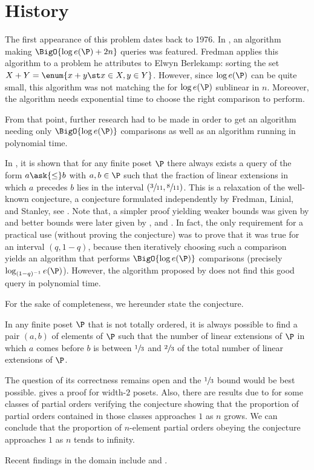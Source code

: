 \section{History}

The first appearance of this problem dates back to 1976. In
\citet*{fredman:1976}, an algorithm making $\BigO{\log e(\P) + 2n}$ queries was
featured. Fredman applies this algorithm to a problem he attributes to Elwyn
Berlekamp: sorting the set $X + Y = \enum{x + y \st x \in X, y \in Y}$.
However,
since \(\log e(\P)\) can be quite small, this algorithm was not matching the \ITLB
for $\log e(\P)$ sublinear in \(n\). Moreover, the algorithm needs exponential time to
choose the right comparison to perform.

From that point, further research had to be made in order to get an algorithm
needing only $\BigO{\log e(\P)}$ comparisons as well as an algorithm running in
polynomial time.

In \citet*{kahn1984balancing}, it is shown that for any finite poset \(\P\)
there always exists a query of the form \(a \ask{\leq} b\) with \(a,b \in \P\)
such that the fraction of linear extensions in which $a$ precedes $b$
lies in the interval $(\sfrac{3}{11}, \sfrac{8}{11})$. This is a relaxation of
the well-known \onethirdtwothird conjecture, a conjecture formulated
independently by Fredman, Linial, and Stanley, see
\citet*{linial:1984}. Note that, a simpler proof yielding weaker
bounds was given by \citet*{kahn1991balancing} and better bounds were later
given by \citet*{brightwell1995balancing}, and \citet*{brightwell1999balanced}.
In fact, the only requirement for a practical use (without proving the
conjecture) was to prove that it was true for an interval $(q, 1-q)$, because
then iteratively choosing such a comparison yields an algorithm that performs
$\BigO{\log e(\P)}$ comparisons (precisely $\log_{(1-q)^{-1}} e(\P)$). However, the
algorithm proposed by \citet*{kahn1984balancing} does not find this
good query in polynomial time.

For the sake of completeness, we hereunder state the \onethirdtwothird
conjecture.
\begin{conjecture}
In any finite poset $\P$ that is not totally ordered, it is always possible to
find a pair $(a,b)$ of elements of $\P$ such that the number of linear
extensions of $\P$ in which $a$ comes before $b$ is between $\sfrac{1}{3}$ and
$\sfrac{2}{3}$ of the total number of linear extensions of $\P$.
\end{conjecture}

The question of its correctness remains open and the
$\sfrac{1}{3}$ bound would be best possible. \citet*{linial:1984} gives a proof
for width-\(2\) posets. Also, there are results due to
\citet*{peczarski:2006} for some classes of partial orders verifying the
conjecture showing that the proportion of partial orders contained in those
classes approaches $1$ as $n$ grows. We can conclude that the proportion of
$n$-element partial orders obeying the \onethirdtwothird conjecture approaches
$1$ as \(n\) tends to infinity.

Recent findings in the domain include \citet*{zaguia:2011} and
\citet*{peczarski:2008}.
